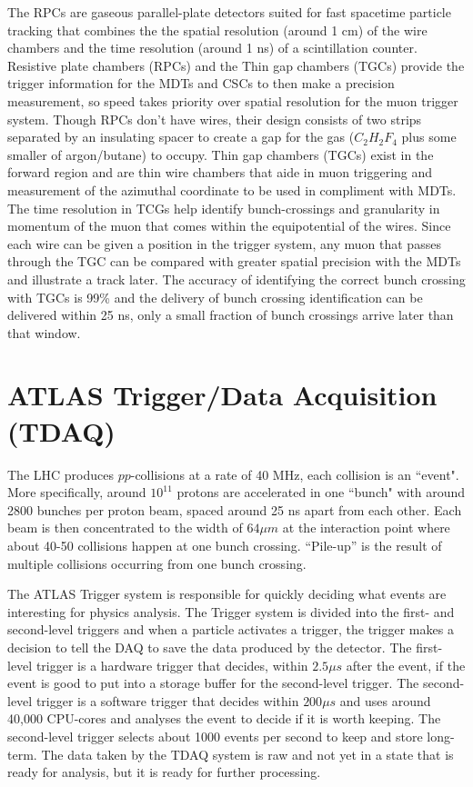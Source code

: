 The RPCs are gaseous parallel-plate detectors suited for fast spacetime particle tracking that combines the the spatial resolution (around 1 cm) of the wire chambers and the time resolution (around 1 ns) of a scintillation counter.
Resistive plate chambers (RPCs) and the Thin gap chambers (TGCs) provide the trigger information for the MDTs and CSCs to then make a precision measurement, so speed takes priority over spatial resolution for the muon trigger system. 
Though RPCs don't have wires, their design consists of two strips separated by an insulating spacer to create a gap for the gas ($C_2 H_2 F_4$ plus some smaller of argon/butane) to occupy.
Thin gap chambers (TGCs) exist in the forward region and are thin wire chambers that aide in muon triggering and measurement of the azimuthal coordinate to be used in compliment with MDTs.
The time resolution in TCGs help identify bunch-crossings and granularity in momentum of the muon that comes within the equipotential of the wires. 
Since each wire can be given a position in the trigger system, any muon that passes through the TGC can be compared with greater spatial precision with the MDTs and illustrate a track later.
The accuracy of identifying the correct bunch crossing with TGCs is 99\% and the delivery of bunch crossing identification can be delivered within 25 ns, only a small fraction of bunch crossings arrive later than that window.

\section{ATLAS Trigger/Data Acquisition (TDAQ)}

The LHC produces $pp$-collisions at a rate of 40 MHz, each collision is an ``event". 
More specifically, around $10^{11}$ protons are accelerated in one ``bunch" with around 2800 bunches per proton beam, spaced around 25 ns apart from each other. 
Each beam is then concentrated to the width of $64 \mu m$ at the interaction point where about 40-50 collisions happen at one bunch crossing. 
``Pile-up'' is the result of multiple collisions occurring from one bunch crossing.

The ATLAS Trigger system is responsible for quickly deciding what events are interesting for physics analysis.
The Trigger system is divided into the first- and second-level triggers and when a particle activates a trigger, the trigger makes a decision to tell the DAQ to save the data produced by the detector. 
The first-level trigger is a hardware trigger that decides, within $2.5 \mu s$ after the event, if the event is good to put into a storage buffer for the second-level trigger.
The second-level trigger is a software trigger that decides within $200 \mu s$ and uses around 40,000 CPU-cores and analyses the event to decide if it is worth keeping. 
The second-level trigger selects about 1000 events per second to keep and store long-term.\cite{Trigger-DAQ}
The data taken by the TDAQ system is raw and not yet in a state that is ready for analysis, but it is ready for further processing. 

